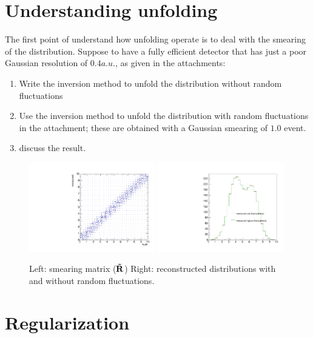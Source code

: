 \documentclass[a4paper,11pt]{article}
\begin{document}
\section{Understanding unfolding}

The first point of understand how unfolding operate is to deal with the smearing of the distribution.
Suppose to have a fully efficient detector that has just a poor Gaussian resolution of $0.4 a.u.$, as given in the attachments:
\begin{enumerate}
	\item Write the inversion method to unfold the distribution without random fluctuations
	\item Use the inversion method to unfold the distribution with random fluctuations in the attachment; these are obtained with a Gaussian smearing of $1.0$ event.
	\item discuss the result.
\end{enumerate}
\begin{figure}[H]
	\includegraphics[width=0.49\textwidth]{figs/respt.pdf}
	\includegraphics[width=0.49\textwidth]{figs/reco.pdf}
	\caption{
		\label{fig:exe1}
		Left: smearing matrix ($\mathbf{\tilde{R}}$) 
		Right: reconstructed distributions with and without random fluctuations.
	}	
\end{figure}
\FloatBarrier

\section{Regularization}
\end{document}
